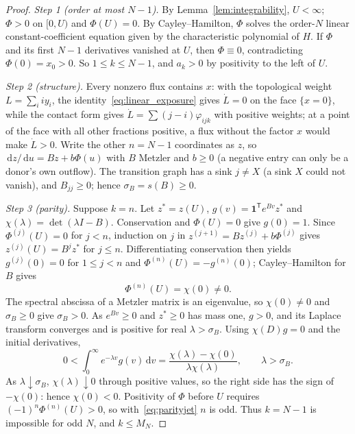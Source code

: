 \documentclass[11pt,a4paper]{article}
\theoremstyle{definition}\newtheorem{definition}[theorem]{Definition}
\theoremstyle{remark}\newtheorem{remark}[theorem]{Remark}
\newcommand{\dd}{\,\mathrm d}
\newcommand{\one}{\mathbf 1}
\begin{document}
\begin{proof}
\emph{Step 1 (order at most $N-1$).} By Lemma~\ref{lem:integrability},
$U<\infty$; $\Phi>0$ on $[0,U)$ and $\Phi(U)=0$. By Cayley--Hamilton,
$\Phi$ solves the order-$N$ linear constant-coefficient equation given by
the characteristic polynomial of $H$. If $\Phi$ and its first $N-1$
derivatives vanished at $U$, then $\Phi\equiv0$, contradicting
$\Phi(0)=x_0>0$. So $1\le k\le N-1$, and $a_k>0$ by positivity to the
left of $U$.

\emph{Step 2 (structure).} Every nonzero flux contains $x$: with the
topological weight $L=\sum_iiy_i$, the identity~\eqref{eq:linear_exposure}
gives $\dot L=0$ on the face $\{x=0\}$, while the contact form gives
$\dot L=\sum(j-i)\varphi_{ijk}$ with positive weights; at a point of the
face with all other fractions positive, a flux without the factor $x$
would make $\dot L>0$. Write the other $n=N-1$ coordinates as $z$, so
$\dd z/\dd u=Bz+b\Phi(u)$ with $B$ Metzler and $b\ge0$ (a negative entry
can only be a donor's own outflow). The transition graph has a sink
$j\ne X$ (a sink $X$ could not vanish), and $B_{jj}\ge0$; hence
$\sigma_B=s(B)\ge0$.

\emph{Step 3 (parity).} Suppose $k=n$. Let $z^*=z(U)$,
$g(v)=\one^{\mathsf T}e^{Bv}z^*$ and $\chi(\lambda)=\det(\lambda I-B)$.
Conservation and $\Phi(U)=0$ give $g(0)=1$. Since
$\Phi^{(j)}(U)=0$ for $j<n$, induction on $j$ in
$z^{(j+1)}=Bz^{(j)}+b\Phi^{(j)}$ gives $z^{(j)}(U)=B^jz^*$ for $j\le n$.
Differentiating conservation then yields $g^{(j)}(0)=0$ for $1\le j<n$
and $\Phi^{(n)}(U)=-g^{(n)}(0)$; Cayley--Hamilton for $B$ gives
\begin{equation}
\Phi^{(n)}(U)=\chi(0)\ne0 .
\label{eq:parityjet}
\end{equation}
The spectral abscissa of a Metzler matrix is an eigenvalue, so
$\chi(0)\ne0$ and $\sigma_B\ge0$ give $\sigma_B>0$. As $e^{Bv}\ge0$ and
$z^*\ge0$ has mass one, $g>0$, and its Laplace transform converges and is
positive for real $\lambda>\sigma_B$. Using $\chi(D)g=0$ and the initial
derivatives,
\begin{equation}
0<\int_0^\infty e^{-\lambda v}g(v)\dd v=\frac{\chi(\lambda)-\chi(0)}{\lambda\chi(\lambda)},
\qquad\lambda>\sigma_B .
\label{eq:paritylaplace}
\end{equation}
As $\lambda\downarrow\sigma_B$, $\chi(\lambda)\downarrow0$ through
positive values, so the right side has the sign of $-\chi(0)$: hence
$\chi(0)<0$. Positivity of $\Phi$ before $U$ requires
$(-1)^n\Phi^{(n)}(U)>0$, so with~\eqref{eq:parityjet} $n$ is odd. Thus
$k=N-1$ is impossible for odd $N$, and $k\le M_N$.


\end{proof}
\end{document}
